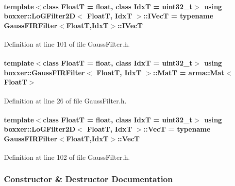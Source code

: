 \paragraph[{\texorpdfstring{I\+VecT}{IVecT}}]{\setlength{\rightskip}{0pt plus 5cm}template$<$class FloatT  = float, class IdxT  = uint32\+\_\+t$>$ using {\bf boxxer\+::\+Lo\+G\+Filter2D}$<$ FloatT, IdxT $>$\+::{\bf I\+VecT} =  typename {\bf Gauss\+F\+I\+R\+Filter}$<$FloatT,IdxT$>$\+::{\bf I\+VecT}}\hypertarget{classboxxer_1_1LoGFilter2D_a14d26374dbb49a5e1cf43bb2257073ab}{}\label{classboxxer_1_1LoGFilter2D_a14d26374dbb49a5e1cf43bb2257073ab}


Definition at line 101 of file Gauss\+Filter.\+h.

\paragraph[{\texorpdfstring{MatT}{MatT}}]{\setlength{\rightskip}{0pt plus 5cm}template$<$class FloatT = float, class IdxT = uint32\+\_\+t$>$ using {\bf boxxer\+::\+Gauss\+F\+I\+R\+Filter}$<$ FloatT, IdxT $>$\+::{\bf MatT} =  arma\+::\+Mat$<$FloatT$>$\hspace{0.3cm}{\ttfamily [inherited]}}\hypertarget{classboxxer_1_1GaussFIRFilter_a83cf4c7f4782f69918c0e0883fff5412}{}\label{classboxxer_1_1GaussFIRFilter_a83cf4c7f4782f69918c0e0883fff5412}


Definition at line 26 of file Gauss\+Filter.\+h.

\paragraph[{\texorpdfstring{VecT}{VecT}}]{\setlength{\rightskip}{0pt plus 5cm}template$<$class FloatT  = float, class IdxT  = uint32\+\_\+t$>$ using {\bf boxxer\+::\+Lo\+G\+Filter2D}$<$ FloatT, IdxT $>$\+::{\bf VecT} =  typename {\bf Gauss\+F\+I\+R\+Filter}$<$FloatT,IdxT$>$\+::{\bf VecT}}\hypertarget{classboxxer_1_1LoGFilter2D_ac08d7bc8f4656f625c984a8a15db5e71}{}\label{classboxxer_1_1LoGFilter2D_ac08d7bc8f4656f625c984a8a15db5e71}


Definition at line 102 of file Gauss\+Filter.\+h.



\subsubsection{Constructor \& Destructor Documentation}

